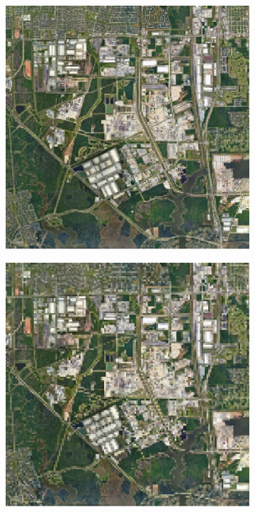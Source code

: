 \begin{figure}[H]
    \centering

    \begin{subfigure}[b]{0.3\textwidth}
        \includegraphics[width=\textwidth]{4.Payload/Houston GSD 30.jpg}
    \end{subfigure}
    \hfill
    \begin{subfigure}[b]{0.3\textwidth}
        \includegraphics[width=\textwidth]{4.Payload/HoustonGSD50.jpg}

\end{subfigure}
\end{figure}
